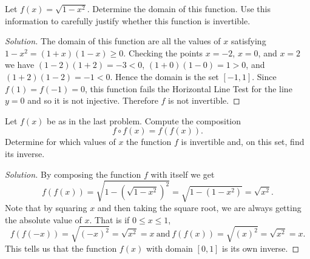 \documentclass[12pt]{amsart}
\begin{document}
\begin{thm}[16 Points]
  Let $f(x) = \sqrt{1 - x^2}$.  Determine the domain of this function.
  Use this information to carefully justify whether this function is invertible.

  \begin{proof}[Solution]
    The domain of this function are all the values of $x$ satisfying $1 - x^2 = (1 + x)(1 - x) \geq 0$.
    Checking the points $x = -2$, $x = 0$, and $x = 2$ we have
    $(1 - 2)(1 + 2) = -3 < 0$, $(1 + 0)(1 - 0) = 1 > 0$, and $(1 + 2)(1 - 2) = -1 < 0$.
    Hence the domain is the set $[-1, 1]$.
    Since $f(1) = f(-1) = 0$, this function fails the Horizontal Line Test for the line $y = 0$ and so it is not injective.
    Therefore $f$ is not invertible.
  \end{proof}
\end{thm}

\begin{thm}\label{bonus}
  Let $f(x)$ be as in the last problem.
  Compute the composition $$f \circ f (x) = f(f(x)).$$
  Determine for which values of $x$ the function $f$ is invertible and, on this set, find its inverse.
  
  \begin{proof}[Solution]
    By composing the function $f$ with itself we get
    $$f(f(x)) = \sqrt{1 - (\sqrt{1 - x^2})^2} = \sqrt{1 - (1 - x^2)} = \sqrt{x^2}.$$
    Note that by squaring $x$ and then taking the square root, we are always getting the absolute value of $x$.
    That is if $0 \leq x \leq 1$, 
    $$f(f(-x)) = \sqrt{(-x)^2} = \sqrt{x^2} = x\ \text{and}\ f(f(x)) = \sqrt{(x)^2} = \sqrt{x^2} = x.$$
    This tells us that the function $f(x)$ with domain $[0,1]$ is its own inverse.
  \end{proof}
\end{thm}
\end{document}
